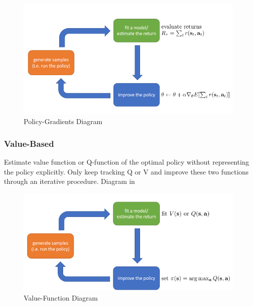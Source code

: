\documentclass[]{article}
\begin{document}
\begin{figure}
\begin{center}
    \includegraphics[scale=0.5]{cap3img/policy.png}
\end{center}
\caption{Policy-Gradients Diagram}
\label{fig:Policy}
\end{figure}



\subsubsection*{Value-Based}
\label{sub:Value-Based}

\par Estimate value function or Q-function of the optimal policy without representing the policy explicitly.  Only keep
tracking Q or V and improve these two functions through an iterative procedure. Diagram in 

\begin{figure}
\begin{center}
    \includegraphics[scale=0.5]{cap3img/valurfunction.png}
\end{center}
\caption{Value-Function Diagram}
\label{fig:valuefunction}
\end{figure}
\end{document}

